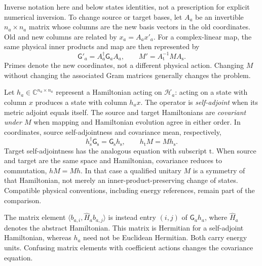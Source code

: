 Inverse notation here and below states identities, not a prescription for
explicit numerical inversion. To change source or target bases, let $A_a$ be
an invertible $n_a\times n_a$ matrix whose columns are the new basis vectors
in the old coordinates. Old and new columns are related by $x_a=A_a x'_a$.
For a complex-linear map, the same physical inner products and map are then
represented by
\begin{equation}
  \mathsf G'_a=A_a^{\dagger}\mathsf G_a A_a,
  \qquad M'=A_{\mathrm t}^{-1}MA_{\mathrm s}.
  \label{eq:symmetry-basis-change}
\end{equation}
Primes denote the new coordinates, not a different physical action. Changing
$M$ without changing the associated Gram matrices generally changes the problem.

\begin{definition}
\label{def:symmetry-operator-covariance}
Let $h_a\in\mathbb C^{n_a\times n_a}$ represent a Hamiltonian acting on
$\mathcal H_a$: acting on a state with column $x$ produces a state with
column $h_a x$. The operator is \emph{self-adjoint} when its metric adjoint
equals itself. The source and target Hamiltonians are \emph{covariant under
$M$} when mapping and Hamiltonian evolution agree in either order.
In coordinates, source self-adjointness and covariance mean, respectively,
\begin{equation}
  h_{\mathrm s}^{\dagger}\mathsf G_{\mathrm s}
    =\mathsf G_{\mathrm s}h_{\mathrm s},
  \qquad h_{\mathrm t}M=Mh_{\mathrm s}.
  \label{eq:symmetry-operator-covariance}
\end{equation}
Target self-adjointness has the analogous equation with subscript $\mathrm t$.
When source and target are the same space and Hamiltonian, covariance reduces
to commutation, $hM=Mh$. In that case a qualified unitary $M$ is a symmetry
of that Hamiltonian, not merely an inner-product-preserving change of states.
Compatible physical conventions, including energy references, remain part of
the comparison.
\end{definition}

The matrix element $\langle b_{a,i},\widehat H_a b_{a,j}\rangle$ is instead
entry $(i,j)$ of $\mathsf G_a h_a$, where $\widehat H_a$ denotes the abstract
Hamiltonian. This matrix is Hermitian for a self-adjoint Hamiltonian, whereas
$h_a$ need not be Euclidean Hermitian. Both carry energy units. Confusing
matrix elements with coefficient actions changes the covariance equation.

